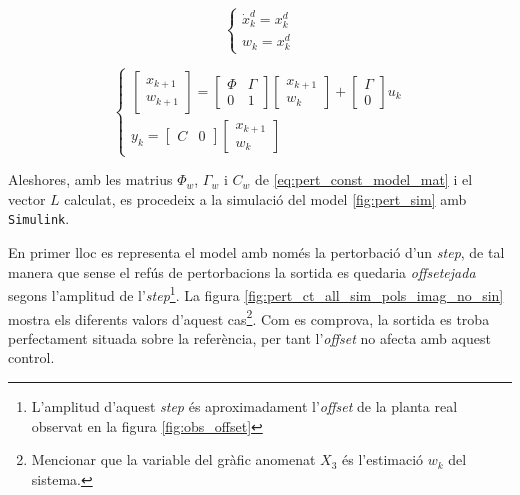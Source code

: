 \documentclass[12pt,a4paper,final,twoside,openright]{report}
\begin{document}
\begin{equation}\label{eq:pert_const}
\left\{
\begin{array}{lr}
\dot{x}^d_k = x^d_k\\
w_k = x^d_k
\end{array}
\right.
\end{equation}

\begin{equation}\label{eq:pert_const_model_mat}
\left\{
\begin{array}{lr}
\begin{bmatrix}
x_{k+1}\\
w_{k+1}
\end{bmatrix} = 
\begin{bmatrix}
\Phi & \Gamma \\
0 & 1
\end{bmatrix} \begin{bmatrix}
x_{k+1}\\
w_k
\end{bmatrix} + 
\begin{bmatrix}
\Gamma\\
0
\end{bmatrix} u_k\\
y_k=\begin{bmatrix}
C & 0
\end{bmatrix} \begin{bmatrix}
x_{k+1}\\
w_k
\end{bmatrix}
\end{array}
\right.
\end{equation}

Aleshores, amb les matrius $\Phi_w$, $\Gamma_w$ i $C_w$ de \eqref{eq:pert_const_model_mat} i el vector $L$ calculat, es procedeix a la simulació del model \ref{fig:pert_sim} amb \texttt{Simulink}.

En primer lloc es representa el model amb només la pertorbació d'un \textit{step}, de tal manera que sense el refús de pertorbacions la sortida es quedaria \textit{offsetejada} segons l'amplitud de l'\textit{step}\footnote{L'amplitud d'aquest \textit{step} és aproximadament l'\textit{offset} de la planta real observat en la figura \ref{fig:obs_offset}}. La figura \ref{fig:pert_ct_all_sim_pols_imag_no_sin} mostra els diferents valors d'aquest cas\footnote{Mencionar que la variable del gràfic anomenat $X_3$ és l'estimació $w_k$ del sistema.}. Com es comprova, la sortida es troba perfectament situada sobre la referència, per tant l'\textit{offset} no afecta amb aquest control.
\end{document}
